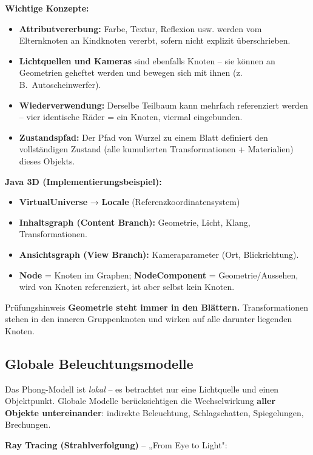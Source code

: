 \documentclass[12pt, a4paper]{article}
\begin{document}
\textbf{Wichtige Konzepte:}
\begin{itemize}
  \item \textbf{Attributvererbung:} Farbe, Textur, Reflexion usw. werden vom Elternknoten an Kindknoten vererbt, sofern nicht explizit überschrieben.
  \item \textbf{Lichtquellen und Kameras} sind ebenfalls Knoten -- sie können an Geometrien geheftet werden und bewegen sich mit ihnen (z.\,B.\ Autoscheinwerfer).
  \item \textbf{Wiederverwendung:} Derselbe Teilbaum kann mehrfach referenziert werden -- vier identische Räder = ein Knoten, viermal eingebunden.
  \item \textbf{Zustandspfad:} Der Pfad von Wurzel zu einem Blatt definiert den vollständigen Zustand (alle kumulierten Transformationen + Materialien) dieses Objekts.
\end{itemize}

\textbf{Java 3D (Implementierungsbeispiel):}
\begin{itemize}
  \item \textbf{VirtualUniverse} → \textbf{Locale} (Referenzkoordinatensystem)
  \item \textbf{Inhaltsgraph (Content Branch):} Geometrie, Licht, Klang, Transformationen.
  \item \textbf{Ansichtsgraph (View Branch):} Kameraparameter (Ort, Blickrichtung).
  \item \textbf{Node} = Knoten im Graphen; \textbf{NodeComponent} = Geometrie/Aussehen, wird von Knoten referenziert, ist aber selbst kein Knoten.
\end{itemize}

\begin{notebox}{Prüfungshinweis}
\textbf{Geometrie steht immer in den Blättern.} Transformationen stehen in den inneren Gruppenknoten und wirken auf alle darunter liegenden Knoten.
\end{notebox}

\subsection*{Globale Beleuchtungsmodelle}

Das Phong-Modell ist \textit{lokal} -- es betrachtet nur eine Lichtquelle und einen Objektpunkt. Globale Modelle berücksichtigen die Wechselwirkung \textbf{aller Objekte untereinander}: indirekte Beleuchtung, Schlagschatten, Spiegelungen, Brechungen.

\medskip
\textbf{Ray Tracing (Strahlverfolgung)} -- „From Eye to Light":
\end{document}
